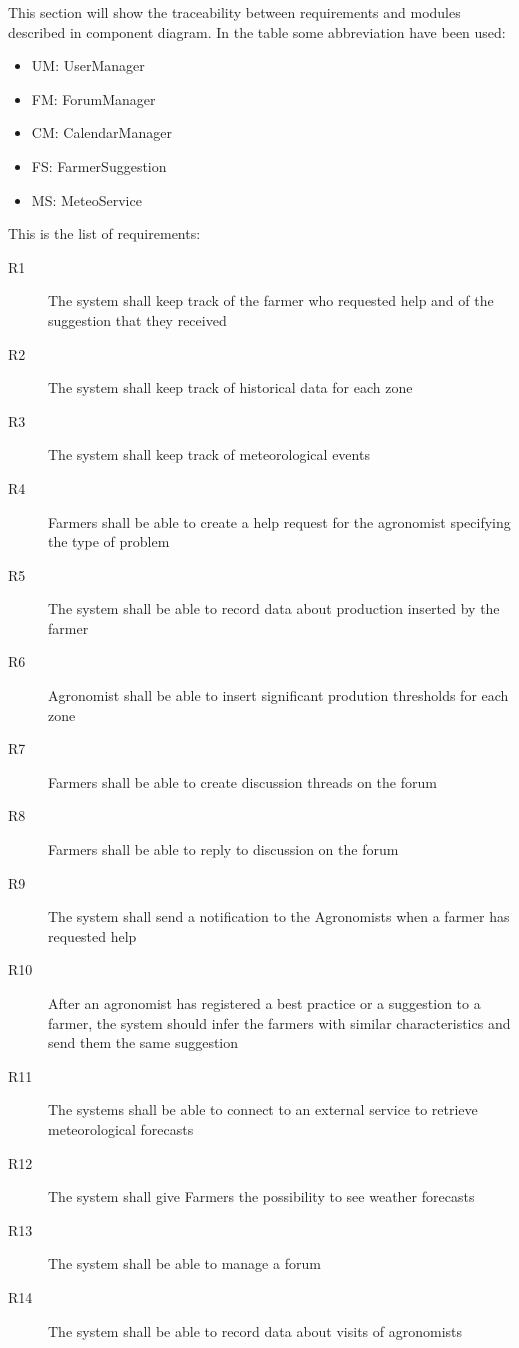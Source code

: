 This section will show the traceability between requirements and modules described in component diagram.\newline
In the table some abbreviation have been used:\newline
\begin{itemize}
    \item UM: UserManager
    \item FM: ForumManager
    \item CM: CalendarManager
    \item FS: FarmerSuggestion
    \item MS: MeteoService
\end{itemize}
\bigskip
This is the list of requirements:
\begin{description}
    \item[R1] The system shall keep track of the farmer who requested help and of the suggestion that they received
    \item[R2] The system shall keep track of historical data for each zone
    \item[R3] The system shall keep track of meteorological events
    \item[R4] Farmers shall be able to create a help request for the agronomist specifying the type of problem 
    \item[R5] The system shall be able to record data about production inserted by the farmer
    \item[R6] Agronomist shall be able to insert significant prodution thresholds for each zone
    \item[R7] Farmers shall be able to create discussion threads on the forum 
    \item[R8] Farmers shall be able to reply to discussion on the forum
    \item[R9] The system shall send a notification to the Agronomists when a farmer has requested help
    \item[R10] After an agronomist has registered a best practice or a suggestion to a farmer, the system should infer the farmers with similar characteristics and send them the same suggestion
    \item[R11] The systems shall be able to connect to an external service to retrieve meteorological forecasts
    \item[R12] The system shall give Farmers the possibility to see weather forecasts           
    \item[R13] The system shall be able to manage a forum
    \item[R14] The system shall be able to record data about visits of agronomists

\end{description}
